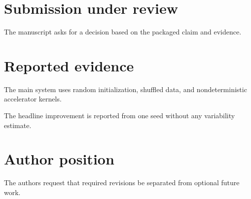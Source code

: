\documentclass{article}
\begin{document}
\section{Submission under review}
The manuscript asks for a decision based on the packaged claim and evidence.
\section{Reported evidence}
The main system uses random initialization, shuffled data, and nondeterministic accelerator kernels.

The headline improvement is reported from one seed without any variability estimate.
\section{Author position}
The authors request that required revisions be separated from optional future work.
\end{document}
